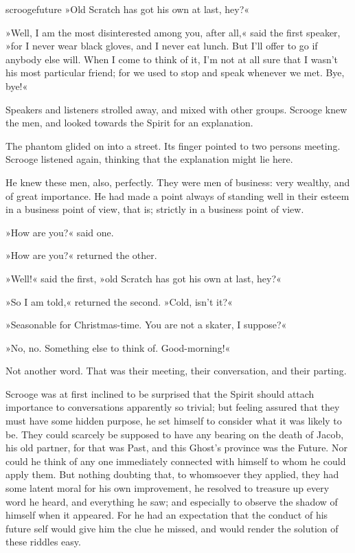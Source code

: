 \begin{colorbigpic}
	[\smallpicsize]
	{scroogefuture}
	{»Old Scratch has got his own at last, hey?«}
\end{colorbigpic}

»Well, I am the most disinterested among you, after all,« said the first speaker, »for I never wear black gloves, and I never eat lunch. But I'll offer to go if anybody else will. When I come to think of it, I'm not at all sure that I wasn't his most particular friend; for we used to stop and speak whenever we met. Bye, bye!«

Speakers and listeners strolled away, and mixed with other groups. Scrooge knew the men, and looked towards the Spirit for an explanation.

The phantom glided on into a street. Its finger pointed to two persons meeting. Scrooge listened again, thinking that the explanation might lie here.

He knew these men, also, perfectly. They were men of business: very wealthy, and of great importance. He had made a point always of standing well in their esteem in a business point of view, that is; strictly in a business point of view.

»How are you?« said one.

»How are you?« returned the other.

»Well!« said the first, »old Scratch has got his own at last, hey?«

»So I am told,« returned the second. »Cold, isn't it?«

»Seasonable for Christmas-time. You are not a skater, I suppose?«

»No, no. Something else to think of. Good-morning!«

Not another word. That was their meeting, their conversation, and their parting.

Scrooge was at first inclined to be surprised that the Spirit should attach importance to conversations apparently so trivial; but feeling assured that they must have some hidden purpose, he set himself to consider what it was likely to be. They could scarcely be supposed to have any bearing on the death of Jacob, his old partner, for that was Past, and this Ghost's province was the Future. Nor could he think of any one immediately connected with himself to whom he could apply them. But nothing doubting that, to whomsoever they applied, they had some latent moral for his own improvement, he resolved to treasure up every word he heard, and everything he saw; and especially to observe the shadow of himself when it appeared. For he had an expectation that the conduct of his future self would give him the clue he missed, and would render the solution of these riddles easy.

